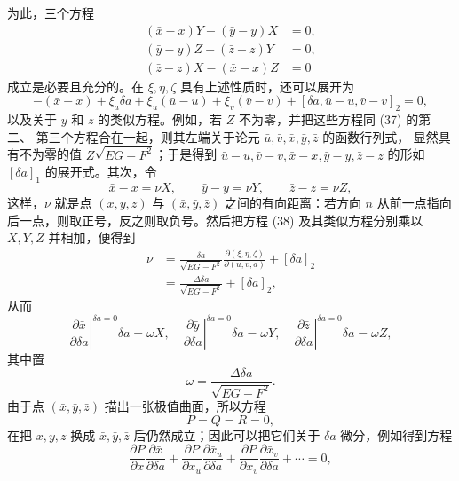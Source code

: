 \documentclass[11pt,a4paper,leqno]{article}
\begin{document}
为此，三个方程
\begin{equation}\tag{37}
\begin{aligned}
(\bar x-x)Y-(\bar y-y)X&=0,\\
(\bar y-y)Z-(\bar z-z)Y&=0,\\
(\bar z-z)X-(\bar x-x)Z&=0
\end{aligned}
\end{equation}
成立是必要且充分的。在 $\xi,\eta,\zeta$ 具有上述性质时，还可以展开为
\begin{equation}\tag{38}
-(\bar x-x)+\xi_a\delta a+\xi_u(\bar u-u)+\xi_v(\bar v-v)
+[\delta a,\bar u-u,\bar v-v]_2=0,
\end{equation}
以及关于 $y$ 和 $z$ 的类似方程。例如，若 $Z$ 不为零，并把这些方程同 (37) 的第二、
第三个方程合在一起，则其左端关于论元 $\bar u,\bar v,\bar x,\bar y,\bar z$ 的函数行列式，
显然具有不为零的值 $Z\sqrt{EG-F^2}$；于是得到
$\bar u-u,\bar v-v,\bar x-x,\bar y-y,\bar z-z$ 的形如
$[\delta a]_1$ 的展开式。其次，令
\[
\bar x-x=\nu X,\qquad \bar y-y=\nu Y,\qquad \bar z-z=\nu Z,
\]
这样，$\nu$ 就是点 $(x,y,z)$ 与 $(\bar x,\bar y,\bar z)$ 之间的有向距离：若方向
$n$ 从前一点指向后一点，则取正号，反之则取负号。然后把方程 (38) 及其类似方程分别乘以
$X,Y,Z$ 并相加，便得到
\[
\begin{aligned}
\nu
&=\frac{\delta a}{\sqrt{EG-F^2}}
\frac{\partial(\xi,\eta,\zeta)}{\partial(u,v,a)}+[\delta a]_2\\
&=\frac{\Delta\delta a}{\sqrt{EG-F^2}}+[\delta a]_2,
\end{aligned}
\]
从而
\begin{equation}\tag{39}
\left.\frac{\partial\bar x}{\partial\delta a}\right|^{\delta a=0}
\delta a=\omega X,\quad
\left.\frac{\partial\bar y}{\partial\delta a}\right|^{\delta a=0}
\delta a=\omega Y,\quad
\left.\frac{\partial\bar z}{\partial\delta a}\right|^{\delta a=0}
\delta a=\omega Z,
\end{equation}
其中置
\begin{equation}\tag{40}
\omega=\frac{\Delta\delta a}{\sqrt{EG-F^2}}.
\end{equation}
由于点 $(\bar x,\bar y,\bar z)$ 描出一张极值曲面，所以方程
\[
P=Q=R=0,
\]
在把 $x,y,z$ 换成 $\bar x,\bar y,\bar z$ 后仍然成立；因此可以把它们关于 $\delta a$ 微分，例如得到方程
\begin{equation}\tag{41}
\frac{\partial P}{\partial x}\frac{\partial\bar x}{\partial\delta a}
+\frac{\partial P}{\partial x_u}\frac{\partial\bar x_u}{\partial\delta a}
+\frac{\partial P}{\partial x_v}\frac{\partial\bar x_v}{\partial\delta a}
+\cdots=0,
\end{equation}
\end{document}
